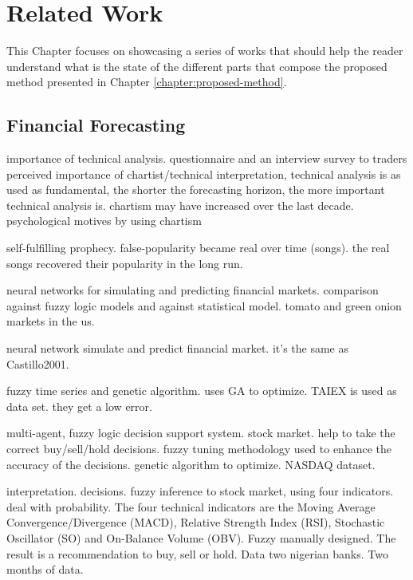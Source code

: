 \chapter{Related Work}
\label{chapter:related-work}

This Chapter focuses on showcasing a series of works that should help the reader
understand what is the state of the different parts that compose the proposed
method presented in Chapter \ref{chapter:proposed-method}.

\section{Financial Forecasting}
\label{section:financial-forecasting}

\cite{Kadiri2015} importance of technical analysis. questionnaire and an interview survey to traders perceived
importance of chartist/technical interpretation, technical analysis is as used
as fundamental, the shorter the forecasting horizon, the more important
technical analysis is. chartism may have increased over the last
decade. psychological motives by using chartism

\cite{Salganik2008} self-fulfilling prophecy. false-popularity became real over time (songs). the
real songs recovered their popularity in the long run.

\cite{Castillo2001} neural networks for simulating and predicting financial markets. comparison
against fuzzy logic models and against statistical model. tomato and green onion
markets in the us.

\cite{melin2007hybrid} neural network simulate and predict financial
market. it's the same as Castillo2001.

\cite{Cai2013} fuzzy time series and genetic algorithm. uses GA to optimize. TAIEX is used as
data set. they get a low error.

\cite{Gamil2007} multi-agent, fuzzy logic decision support system. stock market. help to take the
correct buy/sell/hold decisions. fuzzy tuning methodology used to enhance the
accuracy of the decisions. genetic algorithm to optimize. NASDAQ dataset.

\cite{Ijegwa2014} interpretation. decisions. fuzzy inference to stock market, using four
indicators. deal with probability. The four technical indicators are the
Moving Average Convergence/Divergence (MACD), Relative Strength Index (RSI),
Stochastic Oscillator (SO) and On-Balance Volume (OBV). Fuzzy manually
designed. The result is a recommendation to buy, sell or hold. Data two nigerian
banks. Two months of data.

